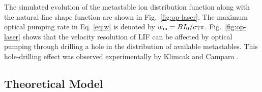 \documentclass[aip,pop,reprint]{revtex4-1}
\begin{document}
The simulated evolution of the metastable ion distribution function along with the natural line shape function are shown in Fig.~\ref{fig:op-laser}. The maximum optical pumping rate in Eq. \ref{eq:w} is denoted by $w_\textup{m}=BI_0/c\gamma \pi$. Fig.~\ref{fig:op-laser} shows that the velocity resolution of LIF can be affected by optical pumping through drilling a hole in the distribution of available metastables. This hole-drilling effect was observed experimentally by Klimcak and Camparo \cite{klimcak_optical-pumping_1984}.


\subsection{Theoretical Model}
\label{subsec:the}

\end{document}
